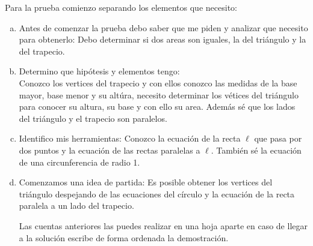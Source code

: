     \item Para la prueba comienzo separando los elementos que necesito:

    \begin{enumerate}[a)]
      \item Antes de comenzar la prueba debo saber que me piden y analizar que necesito para obtenerlo: Debo determinar si dos areas son iguales, la del triángulo y la del trapecio. \\

      \item Determino que hipótesis y elementos tengo:\\
        Conozco los vertices del trapecio y con ellos conozco las medidas de la base mayor, base menor y su altúra, necesito determinar los vétices del triángulo para conocer su altura, su base y con ello su area. Además sé que los lados del triángulo y el trapecio son paralelos.

      \item Identifico mis herramientas: Conozco la ecuación de la recta $\ell$ que pasa por dos puntos y la ecuación de las rectas paralelas a $\ell.$ También sé la ecuación de una circunferencia de radio 1.  

\item Comenzamos una idea de partida: Es posible obtener los vertices del triángulo despejando de las ecuaciones del círculo y la ecuación de la recta paralela a un lado del trapecio. 

Las cuentas anteriores las puedes realizar en una hoja aparte en caso de llegar a la solución escribe de forma ordenada la demostración.

\end{enumerate}

